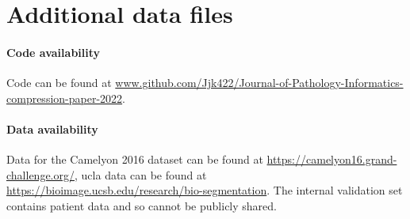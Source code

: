 \documentclass[review]{elsarticle}
\begin{document}
\section{Additional data files}
\paragraph{Code availability} Code can be found at \url{www.github.com/Jjk422/Journal-of-Pathology-Informatics-compression-paper-2022}.
\paragraph{Data availability} Data for the Camelyon 2016 dataset can be found at \url{https://camelyon16.grand-challenge.org/}, \gls{ucla} data can be found at \url{https://bioimage.ucsb.edu/research/bio-segmentation}. The internal validation set contains patient data and so cannot be publicly shared.
\end{document}
